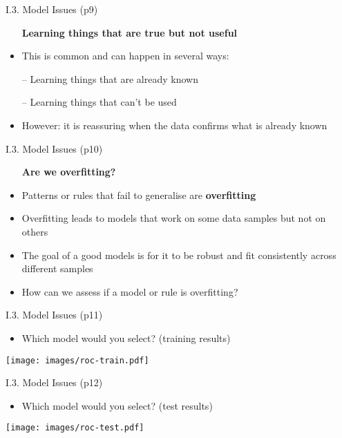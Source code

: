 \documentclass[handout]{beamer}
\newcommand{\strong}[1]{\textbf{\color{teal} #1}}
\begin{document}
\begin{frame}{I.3. Model Issues (p9)}
\begin{itemize}
\item[] \strong{Learning things that are true but not useful}
\item[]
\item This is common and can happen in several ways:
\item[--] Learning things that are already known
\item[--] Learning things that can't be used
\item[]
\item However: it is reassuring when the data confirms what is already known
\end{itemize}
\end{frame}
\begin{frame}{I.3. Model Issues (p10)}
\begin{itemize}
\item[] \strong{Are we overfitting?}
\item[]
\item Patterns or rules that fail to generalise are \strong{overfitting}
\item Overfitting leads to models that work on some data samples but not on others
\item The goal of a good models is for it to be robust  and fit consistently across different samples 
\item[]
\item How can we assess if a model or rule is overfitting?
\end{itemize}
\end{frame}
\begin{frame}{I.3. Model Issues (p11)}
\begin{itemize}
\item Which model would you select? (training results)
\end{itemize}
\begin{center}
\texttt{[image: images/roc-train.pdf]}
\end{center}
\end{frame}
\begin{frame}{I.3. Model Issues (p12)}
\begin{itemize}
\item Which model would you select? (test results)
\end{itemize}
\begin{center}
\texttt{[image: images/roc-test.pdf]}
\end{center}
\end{frame}
\end{document}
